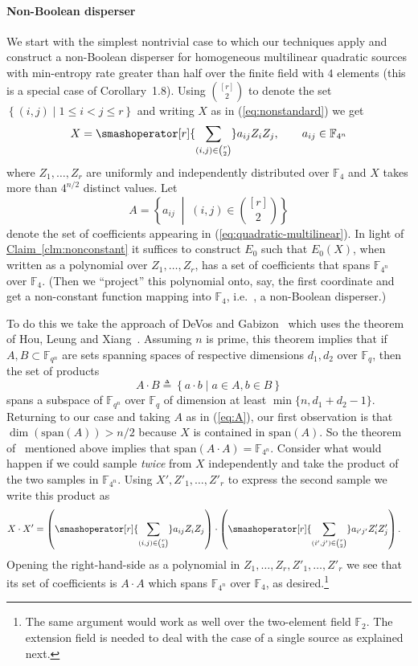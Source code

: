 \documentclass[10pt]{article}
\theoremstyle{definition}
\providecommand{\ie}{i.e.\ }
\numberwithin{equation}{section}
\newcommand{\expref}[2]{\texorpdfstring{\hyperref[#2]{#1~\ref{#2}}}{#1~\ref{#2}}}
\newcommand{\set}[1]{\left \{{#1} \right \}}
\newcommand{\spn}{\textrm{span}}
\newcommand{\F}{\mathbb F_q}
\newcommand{\Ff}{{\mathbb{F}_{4}}}
\newcommand{\Ffn}{{\mathbb{F}_{4^n}}}
\newcommand{\condset}[2]{\set{#1 \mid  #2}}
\begin{document}
\paragraph{Non-Boolean disperser} We start with the simplest nontrivial case to which our techniques apply and construct a non-Boolean disperser for homogeneous multilinear quadratic sources with min-entropy rate greater than half over the finite field with $4$ elements (this is a special case of Corollary~1.8).
Using
%
%
$\binom{[r]}{2}$
to denote the set $\condset{(i,j)}{1\leq i< j\leq r}$ and writing $X$ as in (\ref{eq:nonstandard}) we get
\begin{equation}
  \label{eq:quadratic-multilinear}
  X=\smashoperator[r]{\sum_{(i,j) \in\binom{r}{2}}} a_{ij} Z_i Z_j, \qquad a_{ij} \in \Ffn
\end{equation}
where $Z_1,\ldots,Z_r$ are uniformly and independently distributed over 
$\Ff$ and $X$ 
%
%
takes more than $4^{n/2}$ distinct values.
Let \begin{equation}
  \label{eq:A}
  A=\left\{ a_{ij} \;\middle|\; (i,j) \in \binom{[r]}{2}\right\}
\end{equation}
denote the set of coefficients appearing in (\ref{eq:quadratic-multilinear}). In light of \expref{Claim}{clm:nonconstant} it suffices to construct $E_0$ such that $E_0(X)$,
 when written as a polynomial over $Z_1,\ldots, Z_r$, has a set of coefficients that spans $\Ffn$ over $\Ff$. (Then we ``project'' this polynomial onto, say, the first coordinate and get a non-constant function mapping into $\Ff$, \ie, a non-Boolean disperser.)

To do this we take the approach of DeVos and Gabizon~\cite{DG10} which uses the theorem of Hou, Leung and Xiang~\cite{HLX02}.
 Assuming $n$ is prime, this theorem implies that if $A,B\subset \mathbb{F}_{q^n}$ are sets spanning spaces of respective dimensions $d_1,d_2$ over $\F$,
 then the set of products \[A\cdot B\triangleq \condset{a\cdot b}{a\in A, b\in B}\] spans a subspace of $\mathbb{F}_{q^n}$ over $\F$ of dimension at least $\min\{n, d_1+d_2-1 \}$. Returning to our case and taking $A$ as in (\ref{eq:A}), our first observation is that $\dim(\spn(A))>n/2$ because $X$ is contained in $\spn(A)$. So the theorem of~\cite{HLX02} mentioned above implies that $\spn(A\cdot A)=\Ffn$.
Consider what would happen if we could sample \emph{twice} from $X$ independently and take the product of the two samples in $\Ffn$. Using $X',Z'_1,\ldots,Z'_r$ to express the second sample we write this product as
\begin{align*}
  X\cdot X' &=  \left(\smashoperator[r]{\sum_{(i,j) \in\binom{r}{2}}} a_{ij} Z_i Z_j \right)\cdot \left(\smashoperator[r]{\sum_{(i',j') \in\binom{r}{2}}} a_{i'j'} Z'_i Z'_j \right).
\end{align*}
Opening the right-hand-side as a polynomial in $Z_1,\ldots,Z_r,Z'_1,\ldots,Z'_r$ we see that its set of coefficients is $A\cdot A$ which spans $\Ffn$ over $\Ff$, as desired.\footnote{The same argument would work as well over the two-element field $\mathbb{F}_2$. The extension field is needed to deal with the case of a single source as explained next.}
\end{document}
